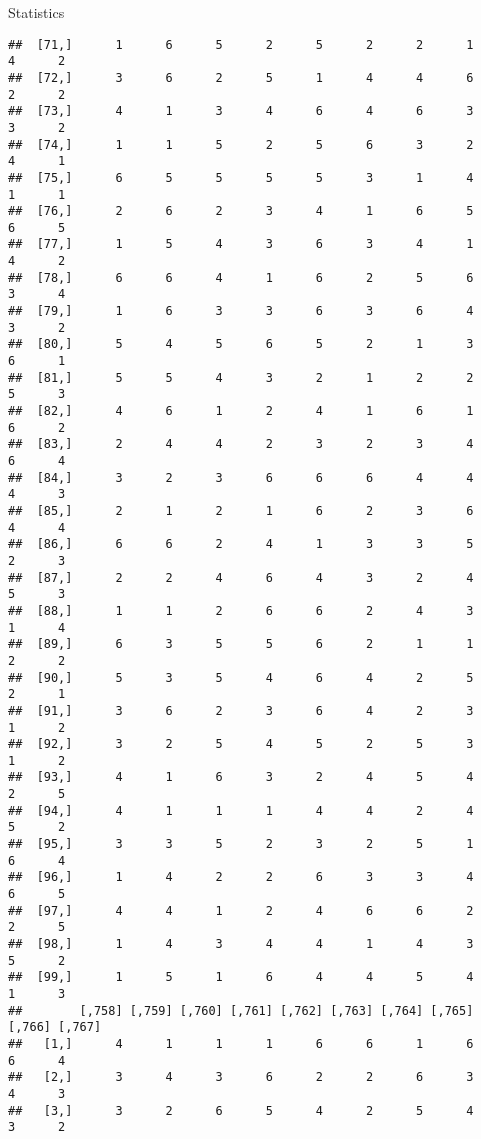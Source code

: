 \documentclass[
  ignorenonframetext,
]{beamer}
\begin{document}
\begin{frame}[fragile]{Statistics}
\begin{verbatim}
##  [71,]      1      6      5      2      5      2      2      1      4      2
##  [72,]      3      6      2      5      1      4      4      6      2      2
##  [73,]      4      1      3      4      6      4      6      3      3      2
##  [74,]      1      1      5      2      5      6      3      2      4      1
##  [75,]      6      5      5      5      5      3      1      4      1      1
##  [76,]      2      6      2      3      4      1      6      5      6      5
##  [77,]      1      5      4      3      6      3      4      1      4      2
##  [78,]      6      6      4      1      6      2      5      6      3      4
##  [79,]      1      6      3      3      6      3      6      4      3      2
##  [80,]      5      4      5      6      5      2      1      3      6      1
##  [81,]      5      5      4      3      2      1      2      2      5      3
##  [82,]      4      6      1      2      4      1      6      1      6      2
##  [83,]      2      4      4      2      3      2      3      4      6      4
##  [84,]      3      2      3      6      6      6      4      4      4      3
##  [85,]      2      1      2      1      6      2      3      6      4      4
##  [86,]      6      6      2      4      1      3      3      5      2      3
##  [87,]      2      2      4      6      4      3      2      4      5      3
##  [88,]      1      1      2      6      6      2      4      3      1      4
##  [89,]      6      3      5      5      6      2      1      1      2      2
##  [90,]      5      3      5      4      6      4      2      5      2      1
##  [91,]      3      6      2      3      6      4      2      3      1      2
##  [92,]      3      2      5      4      5      2      5      3      1      2
##  [93,]      4      1      6      3      2      4      5      4      2      5
##  [94,]      4      1      1      1      4      4      2      4      5      2
##  [95,]      3      3      5      2      3      2      5      1      6      4
##  [96,]      1      4      2      2      6      3      3      4      6      5
##  [97,]      4      4      1      2      4      6      6      2      2      5
##  [98,]      1      4      3      4      4      1      4      3      5      2
##  [99,]      1      5      1      6      4      4      5      4      1      3
##        [,758] [,759] [,760] [,761] [,762] [,763] [,764] [,765] [,766] [,767]
##   [1,]      4      1      1      1      6      6      1      6      6      4
##   [2,]      3      4      3      6      2      2      6      3      4      3
##   [3,]      3      2      6      5      4      2      5      4      3      2

\end{verbatim}
\end{frame}
\end{document}
